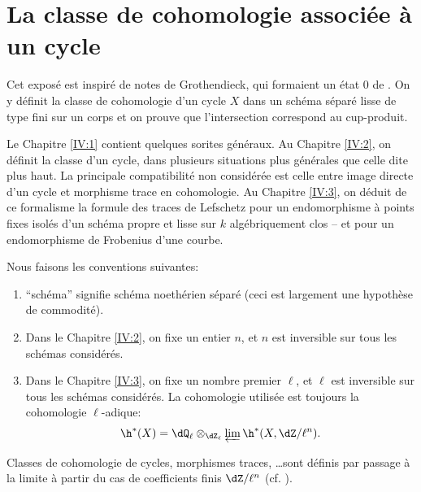 
\chapter{La classe de cohomologie associée à un cycle}\label{IV}




Cet exposé est inspiré de notes de Grothendieck, qui formaient un état 0 
de \cite[IV]{sga5}. On y définit la classe de cohomologie d'un cycle $X$ dans 
un schéma séparé lisse de type fini sur un corps et on prouve que 
l'intersection correspond au cup-produit.

Le Chapitre \ref{IV:1} contient quelques sorites généraux. Au Chapitre \ref{IV:2}, on 
définit la classe d'un cycle, dans plusieurs situations plus générales 
que celle dite plus haut. La principale compatibilité non considérée est 
celle entre image directe d'un cycle et morphisme trace en cohomologie. Au 
Chapitre \ref{IV:3}, on déduit de ce formalisme la formule des traces de Lefschetz pour 
un endomorphisme à points fixes isolés d'un schéma propre et lisse sur $k$ 
algébriquement clos -- et pour un endomorphisme de Frobenius d'une courbe. 

Nous faisons les conventions suivantes:
\begin{enumerate}[\indent 1)]
  \item ``schéma'' signifie schéma noethérien séparé (ceci est 
    largement une hypothèse de commodité).
  \item Dans le Chapitre \ref{IV:2}, on fixe un entier $n$, et $n$ est inversible sur 
    tous les schémas considérés.
  \item Dans le Chapitre \ref{IV:3}, on fixe un nombre premier $\ell$, et $\ell$ est 
    inversible sur tous les schémas considérés. La cohomologie utilisée 
    est toujours la cohomologie $\ell$-adique:
    \[
      \h^*(X) = \dQ_\ell\otimes_{\dZ_\ell} \varprojlim \h^*(X,\dZ/\ell^n) \text{.}
    \]
\end{enumerate}
Classes de cohomologie de cycles, morphismes traces, \ldots sont définis par 
passage à la limite à partir du cas de coefficients finis $\dZ/\ell^n$ (cf. 
\cite[VI]{sga5}).




















